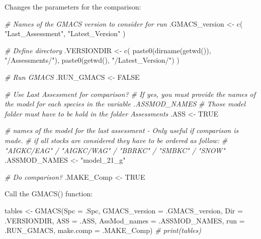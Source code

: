 \documentclass[
]{article}
\newenvironment{Shaded}{\begin{snugshade}}{\end{snugshade}}
\newcommand{\AttributeTok}[1]{\textcolor[rgb]{0.77,0.63,0.00}{#1}}
\newcommand{\CommentTok}[1]{\textcolor[rgb]{0.56,0.35,0.01}{\textit{#1}}}
\newcommand{\ConstantTok}[1]{\textcolor[rgb]{0.00,0.00,0.00}{#1}}
\newcommand{\FunctionTok}[1]{\textcolor[rgb]{0.00,0.00,0.00}{#1}}
\newcommand{\NormalTok}[1]{#1}
\newcommand{\OtherTok}[1]{\textcolor[rgb]{0.56,0.35,0.01}{#1}}
\newcommand{\StringTok}[1]{\textcolor[rgb]{0.31,0.60,0.02}{#1}}
\begin{document}
Changes the parameters for the comparison:

\begin{Shaded}
\begin{Highlighting}[]

\CommentTok{\# Names of the GMACS version to consider for run}
\NormalTok{.GMACS\_version }\OtherTok{\textless{}{-}} \FunctionTok{c}\NormalTok{(}
  \StringTok{"Last\_Assessment"}\NormalTok{,}
  \StringTok{"Latest\_Version"}
\NormalTok{  )}

\CommentTok{\# Define directory}
\NormalTok{.VERSIONDIR }\OtherTok{\textless{}{-}} \FunctionTok{c}\NormalTok{(}
  \FunctionTok{paste0}\NormalTok{(}\FunctionTok{dirname}\NormalTok{(}\FunctionTok{getwd}\NormalTok{()), }\StringTok{"/Assessments/"}\NormalTok{),}
  \FunctionTok{paste0}\NormalTok{(}\FunctionTok{getwd}\NormalTok{(), }\StringTok{"/Latest\_Version/"}\NormalTok{)}
\NormalTok{)}

\CommentTok{\# Run GMACS}
\NormalTok{.RUN\_GMACS }\OtherTok{\textless{}{-}} \ConstantTok{FALSE}

\CommentTok{\# Use Last Assessment for comparison?}
\CommentTok{\# If yes, you must provide the names of the model for each species in the variable .ASSMOD\_NAMES}
\CommentTok{\# Those model folder must have to be hold in the folder Assessments}
\NormalTok{.ASS }\OtherTok{\textless{}{-}} \ConstantTok{TRUE}

\CommentTok{\# names of the model for the last assessment {-} Only useful if comparison is made.}
\CommentTok{\# if all stocks are considered they have to be ordered as follow:}
\CommentTok{\# "AIGKC/EAG" / "AIGKC/WAG" / "BBRKC" / "SMBKC" / "SNOW"}
\NormalTok{.ASSMOD\_NAMES }\OtherTok{\textless{}{-}} \StringTok{"model\_21\_g"}

\CommentTok{\# Do comparison?}
\NormalTok{.MAKE\_Comp }\OtherTok{\textless{}{-}} \ConstantTok{TRUE}
\end{Highlighting}
\end{Shaded}

Call the GMACS() function:

\begin{Shaded}
\begin{Highlighting}[]

\NormalTok{tables }\OtherTok{\textless{}{-}} \FunctionTok{GMACS}\NormalTok{(}\AttributeTok{Spc =}\NormalTok{ .Spc, }\AttributeTok{GMACS\_version =}\NormalTok{ .GMACS\_version,}
        \AttributeTok{Dir =}\NormalTok{ .VERSIONDIR,}
        \AttributeTok{ASS =}\NormalTok{ .ASS,}
        \AttributeTok{AssMod\_names =}\NormalTok{ .ASSMOD\_NAMES,}
        \AttributeTok{run =}\NormalTok{ .RUN\_GMACS,}
        \AttributeTok{make.comp =}\NormalTok{ .MAKE\_Comp)}
\CommentTok{\# print(tables)}
\end{Highlighting}
\end{Shaded}
\end{document}
